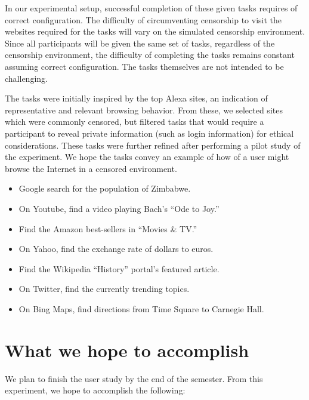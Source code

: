 \documentclass{template}
\begin{document}
In our experimental setup, successful completion of 
these given tasks requires of correct configuration.
The difficulty of circumventing  censorship to visit the 
websites required for the tasks will vary on the 
simulated censorship environment. Since all participants will be given the 
same set of tasks, regardless of the censorship environment, 
the difficulty of completing the tasks remains constant assuming
correct configuration. The tasks themselves are not intended to
be challenging.

The tasks were initially inspired by the top Alexa sites, 
an indication of representative and relevant browsing behavior. 
From these, we selected sites which were commonly censored, 
but filtered tasks that would require a participant to reveal private information 
(such as login information) for ethical considerations. These tasks
were further refined after performing a pilot study of the experiment. 
We hope the tasks convey an example of how of a user might 
browse the Internet in a censored environment. 

\begin{itemize} \itemsep1pt \parskip0pt 
\item Google search for the population of Zimbabwe. 
\item On Youtube, find a video playing Bach's ``Ode to Joy.'' 
\item Find the Amazon best-sellers in ``Movies \& TV.''
\item On Yahoo, find the exchange rate of dollars to euros.
\item Find the Wikipedia ``History'' portal's featured article. 
\item On Twitter, find the currently trending topics.
\item On Bing Maps, find directions from Time Square to Carnegie Hall.
\end{itemize}

\section{What we hope to accomplish}

We plan to finish the user study by the end of the semester. 
From this experiment, we hope to accomplish the following: 
\end{document}
